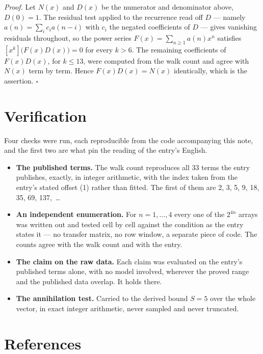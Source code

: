 \documentclass[11pt]{article}
\theoremstyle{definition}
\begin{document}
{\itshape Proof.} Let $N(x)$ and $D(x)$ be the numerator and denominator above, $D(0)=1$. The residual test applied to the recurrence read off $D$ --- namely $a(n) = \sum_i c_i a(n-i)$ with $c_i$ the negated coefficients of $D$ --- gives vanishing residuals throughout, so the power series $F(x)=\sum_{n\ge 1}a(n)x^n$ satisfies $[x^k]\bigl(F(x)D(x)\bigr) = 0$ for every $k > 6$. The remaining coefficients of $F(x)D(x)$, for $k \le 13$, were computed from the walk count and agree with $N(x)$ term by term. Hence $F(x)D(x) = N(x)$ identically, which is the assertion. $\square$

\section{Verification}

Four checks were run, each reproducible from the code accompanying this note, and the first two are what pin the reading of the entry's English.

\begin{itemize}

\item {\bfseries The published terms.} The walk count reproduces all 33 terms the entry publishes, exactly, in integer arithmetic, with the index taken from the entry's stated offset (1) rather than fitted. The first of them are 2, 3, 5, 9, 18, 35, 69, 137,~\dots

\item {\bfseries An independent enumeration.} For $n = 1,\dots,4$ every one of the $2^{4n}$ arrays was written out and tested cell by cell against the condition as the entry states it --- no transfer matrix, no row window, a separate piece of code. The counts agree with the walk count and with the entry.

\item {\bfseries The claim on the raw data.} Each claim was evaluated on the entry's published terms alone, with no model involved, wherever the proved range and the published data overlap. It holds there.

\item {\bfseries The annihilation test.} Carried to the derived bound $S = 5$ over the whole vector, in exact integer arithmetic, never sampled and never truncated.

\end{itemize}

\section{References}
\end{document}
